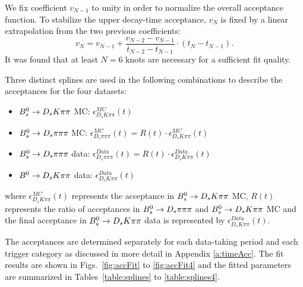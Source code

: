 We fix coefficient $v_{N-1}$ to unity in order to normalize the overall acceptance function. 
To stabilize the upper decay-time acceptance, $v_{N}$ is fixed by a linear extrapolation from the two previous coefficients:
\begin{equation}   
v_{N} = v_{N-1} + \frac{v_{N-2} - v_{N-1}}{t_{N-2} - t_{N-1}} \cdot (t_{N} - t_{N-1}).
\label{eq:SplineExtra}
\end{equation}
It was found that at least $N=6$ knots are necessary for a sufficient fit quality.

\clearpage
Three distinct splines are used in the following combinations to describe the acceptances for the
four datasets:
\begin{itemize}
	\item ${{B}^0_{s}} \rightarrow D_sK\pi\pi$ MC:   $\epsilon^{MC}_{D_sK\pi\pi}(t)$ 
	\item ${{B}^0_{s}} \rightarrow D_s\pi\pi\pi$ MC:   $\epsilon^{MC}_{D_s\pi\pi\pi}(t) = R(t) \cdot \epsilon^{MC}_{D_sK\pi\pi}(t)$ 
	\item ${{B}^0_{s}} \rightarrow D_s\pi\pi\pi$ data:   $\epsilon^{Data}_{D_s\pi\pi\pi}(t) = R(t) \cdot \epsilon^{Data}_{D_sK\pi\pi}(t)$ 
	\item ${{B}^0} \rightarrow D_sK\pi\pi$ data:   $\epsilon^{Data}_{D_sK\pi\pi}(t)$    
\end{itemize}
where $\epsilon^{MC}_{D_sK\pi\pi}(t)$ represents the acceptance in ${{B}^0_{s}} \rightarrow D_sK\pi\pi$ MC, 
$R(t)$ represents  the ratio of acceptances in ${{B}^0_{s}} \rightarrow D_s\pi\pi\pi$ and ${{B}^0_{s}} \rightarrow D_sK\pi\pi$ MC
and the final acceptance in ${{B}^0_{s}} \rightarrow D_sK\pi\pi$ data
is represented by $\epsilon^{Data}_{D_sK\pi\pi}(t)$.

The acceptances are determined separately for each data-taking period
and each trigger category as discussed in more detail in Appendix \ref{a:timeAcc}.
The fit results are shown in Figs.~\ref{fig:accFit} to \ref{fig:accFit4} and the 
fitted parameters are summarized in Tables~\ref{table:splines} to \ref{table:splines4}.
\newline
\\
 
